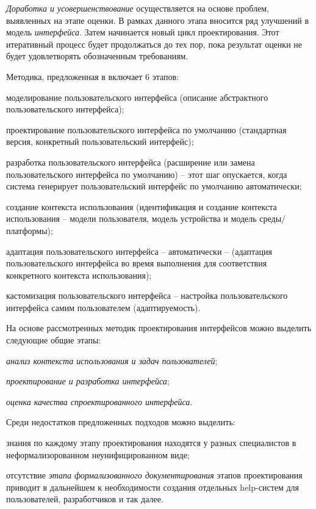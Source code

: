 {\textit{Доработка и усовершенствование} осуществляется на основе проблем, выявленных на этапе оценки. В рамках данного этапа вносится ряд улучшений в модель \textit{интерфейса}. Затем начинается новый цикл проектирования. Этот итеративный процесс будет продолжаться до тех пор, пока результат оценки не будет удовлетворять обозначенным требованиям. 

Методика, предложенная в  включает 6 этапов:
\begin{textitemize}
	\item моделирование пользовательского интерфейса (описание абстрактного пользовательского интерфейса);
	\item проектирование пользовательского интерфейса по умолчанию (стандартная версия, конкретный пользовательский интерфейс);
	\item разработка пользовательского интерфейса (расширение или замена пользовательского интерфейса по умолчанию) -- этот шаг опускается, когда система генерирует пользовательский интерфейс по умолчанию автоматически;
	\item создание контекста использования (идентификация и создание контекста использования -- модели пользователя, модель устройства и модель среды/платформы);
	\item адаптация пользовательского интерфейса -- автоматически -- (адаптация пользовательского интерфейса во время выполнения для соответствия конкретного контекста использования);
	\item кастомизация пользовательского интерфейса -- настройка пользовательского интерфейса самим пользователем (адаптируемость).
\end{textitemize}

На основе рассмотренных методик проектирования интерфейсов можно выделить следующие общие этапы:
\begin{textitemize}
\item \textit{анализ контекста использования и задач пользователей};
\item \textit{проектирование и разработка интерфейса};
\item \textit{оценка качества спроектированного интерфейса}.
\end{textitemize}

Среди недостатков предложенных подходов можно выделить:
\begin{textitemize}
	\item знания по каждому этапу проектирования находятся у разных специалистов в неформализорованном неунифицированном виде;
	\item отсутствие \textit{этапа формализованного документирования} этапов проектирования приводит в дальнейшем к необходимости создания отдельных help-систем для пользователей, разработчиков и так далее.
\end{textitemize}

}
